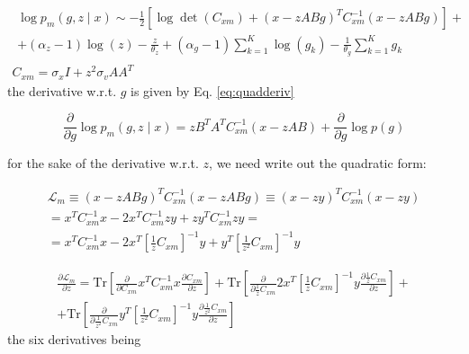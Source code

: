 \documentclass{paper}
\begin{document}
\begin{eqnarray}
\begin{split}
\log p_m(g,z \mid x) \sim -\frac{1}{2} \left[ \log \det (C_{xm}) + (x-zABg)^T C_{xm}^{-1} (x-zABg) \right] + \\
+ (\alpha_z-1)\log(z) - \frac{z}{\theta_z} + (\alpha_g-1)\sum_{k=1}^K \log(g_k) - \frac{1}{\theta_g} \sum_{k=1}^K g_k
\end{split} \\
C_{xm} = \sigma_x I + z^2 \sigma_v AA^T
\end{eqnarray}
%
the derivative w.r.t. $g$ is given by Eq. \ref{eq:quadderiv}

\begin{equation}
\frac{\partial}{\partial g} \log p_m(g,z \mid x) = zB^TA^T C_{xm}^{-1} (x-zAB) + \frac{\partial}{\partial g} \log p(g)
\end{equation}

%
for the sake of the derivative w.r.t. $z$, we need write out the quadratic form:

\begin{equation}
\begin{split}
\mathcal{L}_m \equiv (x-zABg)^T C_{xm}^{-1} (x-zABg) \equiv (x-zy)^T C_{xm}^{-1} (x-zy) \\
= x^T C_{xm}^{-1} x - 2 x^T C_{xm}^{-1} zy + zy^T C_{xm}^{-1} zy = \\
= x^T C_{xm}^{-1} x - 2 x^T \left[ \frac{1}{z} C_{xm} \right]^{-1} y + y^T  \left[ \frac{1}{z^2} C_{xm} \right]^{-1} y
\end{split}
\end{equation}

\begin{equation}
\begin{split}
\frac{\partial  \mathcal{L}_m}{\partial z}  = \mathrm{Tr} \left[  \frac{\partial}{\partial C_{xm}} x^T C_{xm}^{-1} x  \frac{\partial C_{xm}}{\partial z} \right] 
+ \mathrm{Tr} \left[  \frac{\partial}{\partial \frac{1}{z} C_{xm}}  2 x^T \left[ \frac{1}{z} C_{xm} \right]^{-1} y  \frac{\partial \frac{1}{z} C_{xm}}{\partial z} \right] + \\ 
+  \mathrm{Tr} \left[  \frac{\partial}{\partial \frac{1}{z^2} C_{xm}}   y^T  \left[ \frac{1}{z^2} C_{xm} \right]^{-1} y  \frac{\partial \frac{1}{z^2} C_{xm}}{\partial z} \right]
\end{split}
\end{equation}
%
the six derivatives being
\end{document}
